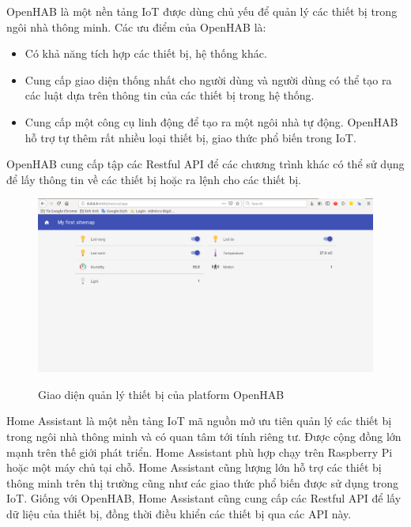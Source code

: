 OpenHAB là một nền tảng IoT được dùng chủ yếu để quản lý các thiết bị trong ngôi nhà thông minh. Các ưu điểm của OpenHAB là:
\begin{itemize}
	\item Có khả năng tích hợp các thiết bị, hệ thống khác.
	\item Cung cấp giao diện thống nhất cho người dùng và người dùng có thể tạo ra các luật dựa trên thông tin của các thiết bị trong hệ thống.
	\item Cung cấp một công cụ linh động để tạo ra một ngôi nhà tự động. OpenHAB hỗ trợ tự thêm rất nhiều loại thiết bị, giao thức phổ biến trong IoT. 
\end{itemize}
OpenHAB cung cấp tập các Restful API để các chương trình khác có thể sử dụng để lấy thông tin về các thiết bị hoặc ra lệnh cho các thiết bị.

\begin{figure}[h!]
	\center
	\includegraphics[scale=0.3]{image/openhab} \\
	\caption{Giao diện quản lý thiết bị của platform OpenHAB}
	\label{fig:giao_dien_openhab}
\end{figure}

Home Assistant là một nền tảng IoT mã nguồn mở ưu tiên quản lý các thiết bị trong ngôi nhà thông minh và có quan tâm tới tính riêng tư. Được cộng đồng lớn mạnh trên thế giới phát triển. Home Assistant phù hợp chạy trên Raspberry Pi hoặc một máy chủ tại chỗ. Home Assistant cũng lượng lớn hỗ trợ các thiết bị thông minh trên thị trường cũng như các giao thức phổ biến được sử dụng trong IoT. Giống với OpenHAB, Home Assistant cũng cung cấp các Restful API để lấy dữ liệu của thiết bị, đồng thời điều khiển các thiết bị qua các API này.
\clearpage

